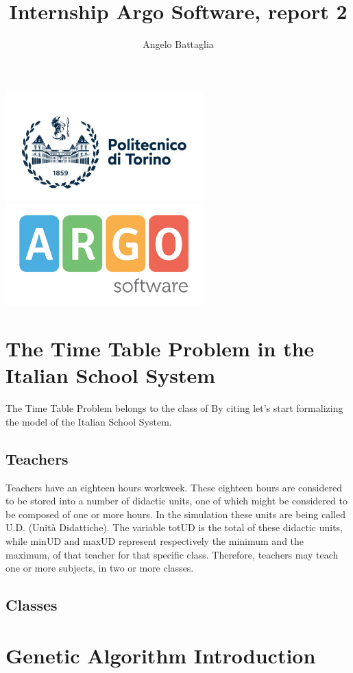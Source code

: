 \documentclass{article}
\author{Angelo Battaglia}
\title{Internship Argo Software, report 2}
\begin{document}
\maketitle

\begin{center}
\includegraphics[width=3in]{./images/polito.jpg}
\includegraphics[width=3in]{./images/og_logoargosoft.png}
\end{center}

\section{The Time Table Problem in the Italian School System}

The Time Table Problem belongs to the class of
By citing \textcite{colorni1992genetic} let's start formalizing 
the model of the Italian School System.


\subsection{Teachers}

Teachers have an eighteen hours workweek. These eighteen hours are
considered to be stored into a number of didactic units, one of which
might be considered to be composed of one or more hours. In the simulation
these units are being called U.D. (Unità Didattiche). The variable totUD is
the total of these didactic units, while minUD and maxUD represent respectively
the minimum and the maximum, of that teacher for that specific class. Therefore, 
teachers may teach one or more subjects, in two or more classes. 

\subsection{Classes}

\section{Genetic Algorithm Introduction}


\printbibliography[title = {Bibliography}]
\end{document}
